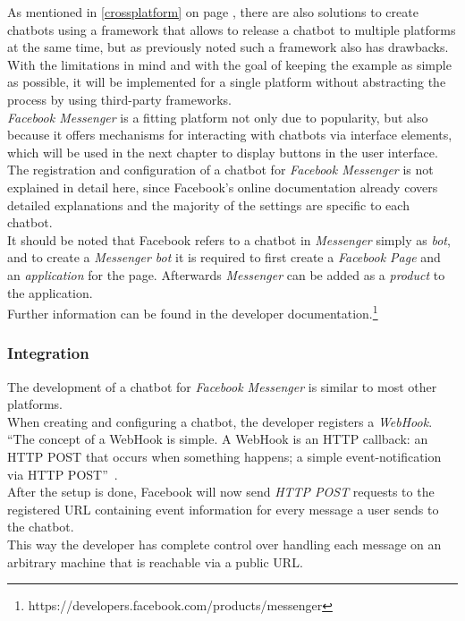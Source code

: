 As mentioned in \ref{crossplatform} on page \pageref{crossplatform},
there are also solutions to create chatbots using a framework that allows to release a chatbot to multiple platforms at the same time,
but as previously noted such a framework also has drawbacks.
\\
With the limitations in mind and with the goal of keeping the example as simple as possible,
it will be implemented for a single platform without abstracting the process by using third-party frameworks.
\\

\emph{Facebook Messenger} is a fitting platform not only due to popularity,
but also because it offers mechanisms for interacting with chatbots via interface elements,
which will be used in the next chapter to display buttons in the user interface.
\\

The registration and configuration of a chatbot for \emph{Facebook Messenger} is not explained in detail here,
since Facebook's online documentation already covers detailed explanations
and the majority of the settings are specific to each chatbot.
\\
It should be noted that Facebook refers to a chatbot in \emph{Messenger} simply as \emph{bot},
and to create a \emph{Messenger bot} it is required to first create a \emph{Facebook Page} and an \emph{application} for the page.
Afterwards \emph{Messenger} can be added as a \emph{product} to the application.
\\
Further information can be found in the developer documentation.\footnote{https://developers.facebook.com/products/messenger}

\subsubsection{Integration}

The development of a chatbot for \emph{Facebook Messenger} is similar to most other platforms.
\\
When creating and configuring a chatbot, the developer registers a \emph{WebHook}.
``The concept of a WebHook is simple. A WebHook is an HTTP callback: an HTTP POST that occurs when something happens; a simple event-notification via HTTP POST''~\cite{webhook}.
\\
After the setup is done,
Facebook will now send \emph{HTTP POST} requests to the registered URL containing event information for every message a user sends to the chatbot.
\\
This way the developer has complete control over handling each message on an arbitrary machine that is reachable via a public URL.


